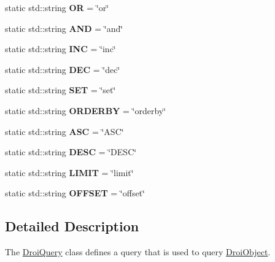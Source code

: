 \begin{DoxyCompactItemize}
\mbox{\label{class_droi_query_a904e58cb886bc7a27b5935e04cebd495}} 
static std\+::string {\bfseries OR} = \char`\"{}or\char`\"{}
\item 
\mbox{\label{class_droi_query_a0b83d423b39229ce0792c2272ba0fa0b}} 
static std\+::string {\bfseries A\+ND} = \char`\"{}and\char`\"{}
\item 
\mbox{\label{class_droi_query_a1791ebcb6d90a32372f08133b5a668f7}} 
static std\+::string {\bfseries I\+NC} = \char`\"{}inc\char`\"{}
\item 
\mbox{\label{class_droi_query_ac244f6b9f8138ba7ae59c86d37b773aa}} 
static std\+::string {\bfseries D\+EC} = \char`\"{}dec\char`\"{}
\item 
\mbox{\label{class_droi_query_a9efe0041e2aaaafb07d47e43a0d94dcc}} 
static std\+::string {\bfseries S\+ET} = \char`\"{}set\char`\"{}
\item 
\mbox{\label{class_droi_query_a00030d9d83166b71f554528caf1b9d4f}} 
static std\+::string {\bfseries O\+R\+D\+E\+R\+BY} = \char`\"{}orderby\char`\"{}
\item 
\mbox{\label{class_droi_query_a448aea6b85da8af40143eada0c978074}} 
static std\+::string {\bfseries A\+SC} = \char`\"{}A\+SC\char`\"{}
\item 
\mbox{\label{class_droi_query_a9dbbcb616b21d637d70e1050a97e4c98}} 
static std\+::string {\bfseries D\+E\+SC} = \char`\"{}D\+E\+SC\char`\"{}
\item 
\mbox{\label{class_droi_query_a82ee26e0d2631af95d0e1cc792486064}} 
static std\+::string {\bfseries L\+I\+M\+IT} = \char`\"{}limit\char`\"{}
\item 
\mbox{\label{class_droi_query_a8def8af0db9757542663298b25b06f7d}} 
static std\+::string {\bfseries O\+F\+F\+S\+ET} = \char`\"{}offset\char`\"{}
\end{DoxyCompactItemize}


\subsection{Detailed Description}
The \hyperlink{class_droi_query}{Droi\+Query} class defines a query that is used to query \hyperlink{class_droi_object}{Droi\+Object}. 

